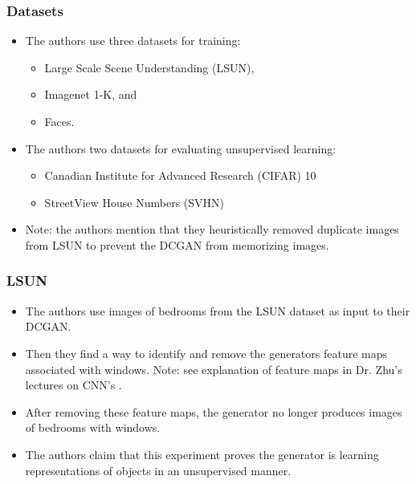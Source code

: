 \documentclass{beamer}
\begin{document}
\begin{frame}
\frametitle{Datasets}
\begin{itemize}
  \item The authors use three datasets for training:
  \begin{itemize}
    \item Large Scale Scene Understanding (LSUN),
    \item Imagenet 1-K, and
    \item Faces.
  \end{itemize}  
  \item The authors two datasets for evaluating unsupervised learning:
  \begin{itemize}
    \item Canadian Institute for Advanced Research (CIFAR) 10
    \item StreetView House Numbers (SVHN)
  \end{itemize}
  \item Note: the authors mention that they heuristically removed duplicate
    images from LSUN to prevent the DCGAN from memorizing images.
\end{itemize}
\end{frame}


\begin{frame}
\frametitle{LSUN}
\begin{itemize}
  \item The authors use images of bedrooms from the LSUN dataset
  \cite{lsunDataset} as input to their DCGAN.

  \item Then they find a way to identify and remove the generators feature maps
  \cite{repLearnDcgan} associated with windows.  Note: see explanation of feature
  maps in Dr. Zhu's lectures on CNN's \cite{cnnlecture}. 

  \item After removing these feature maps, the generator no longer produces images
    of bedrooms with windows.

  \item The authors claim that this experiment proves the generator is learning
   representations of objects in an unsupervised manner. 
\end{itemize}
\end{frame}

\end{document}
